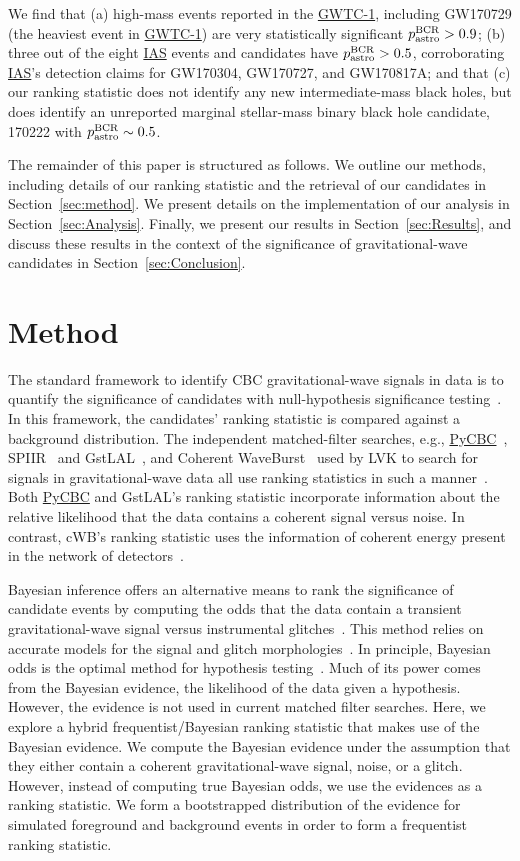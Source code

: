 \documentclass[%
 nofootinbib,
 amsmath,amssymb,
 aps,
 twocolumn,
 superscriptaddress
]{revtex4-2}
\newcommand{\gstlal}{{\sc GstLAL}\xspace}
\newcommand{\cwb}{{\sc cWB}\xspace}
\newcommand{\spiir}{{\sc SPIIR}\xspace}
\newcommand{\pycbc}{{\sc \href{https://pycbc.org/}{{PyCBC}}}\xspace}
\newcommand{\GWTC}{{\sc \href{https://ui.adsabs.harvard.edu/abs/2019PhRvX...9c1040A/abstract}{{GWTC-1}}}\xspace}
\newcommand{\IAS}{{\sc \href{https://ui.adsabs.harvard.edu/abs/2020PhRvD.101h3030V/abstract}{{IAS}}}\xspace}
\newcommand{\fancytext}[1]{{\relax\ifmmode#1\else $#1$\fi}\xspace}
\newcommand{\pastrobcr}{\fancytext{p_\text{astro}^{\text{BCR}}}}
\newcommand{\avi}[1]{\textcolor{orange}{[AV: #1]}}
\begin{document}
We find that (a) high-mass events reported in the \GWTC, including GW170729 (the heaviest event in \GWTC) are very statistically significant $\pastrobcr>0.9$; (b) three out of the eight \IAS events and candidates have $\pastrobcr>0.5$, corroborating \IAS's detection claims for GW170304, GW170727, and GW170817A; and that (c) our ranking statistic does not identify any new intermediate-mass black holes, but does identify an unreported marginal stellar-mass binary black hole candidate, 170222 with $\pastrobcr\sim0.5$. %

The remainder of this paper is structured as follows. We outline our methods, including details of our ranking statistic and the retrieval of our candidates in Section~\ref{sec:method}. We present details on the implementation of our analysis in Section~\ref{sec:Analysis}. Finally, we present our results in Section~\ref{sec:Results}, and discuss these results in the context of the significance of gravitational-wave candidates in Section~\ref{sec:Conclusion}.

\section{Method\label{sec:method}}

The standard framework to identify CBC gravitational-wave signals in data is to quantify the significance of candidates with null-hypothesis significance testing~\cite{GWTC1, GWTC2}. In this framework, the candidates' ranking statistic is compared against a background distribution. The independent matched-filter searches, e.g., \pycbc~\cite{pycbc_og4}, \spiir~\cite{spiir} and \gstlal~\cite{sachdev2019gstlal}, and Coherent WaveBurst~\cite{cwb} used by LVK to search for signals in gravitational-wave data all use ranking statistics in such a manner~\cite{GWTC1}. Both \pycbc and \gstlal's ranking statistic incorporate information about the relative likelihood that the data contains a coherent signal versus noise. In contrast, \cwb's ranking statistic uses the information of coherent energy present in the network of detectors~\cite{GWTC1}. 

Bayesian inference offers an alternative means to rank the significance of candidate events by computing the odds that the data contain a transient gravitational-wave signal versus instrumental glitches~\cite{BCR1}. This method relies on accurate models for the signal and glitch morphologies~\cite{BCR1}. In principle, Bayesian odds is the optimal method for hypothesis testing~\cite{BCR2}. Much of its power comes from the Bayesian evidence, the likelihood of the data given a hypothesis. However, the evidence is not used in current matched filter searches. Here, we explore a hybrid frequentist/Bayesian ranking statistic that makes use of the Bayesian evidence. We compute the Bayesian evidence under the assumption that they either contain a coherent gravitational-wave signal, noise, or a glitch. However, instead of computing true Bayesian odds, we use the evidences as a ranking statistic.
We form a bootstrapped distribution of the evidence for simulated foreground and background events in order to form a frequentist ranking statistic.
\end{document}
